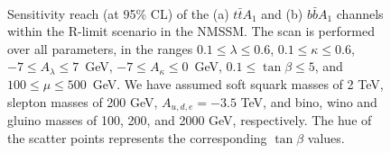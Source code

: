 \documentclass[preprintnumbers,superscriptaddress,nofootinbib,aps,prd,floatfix]{revtex4}
\begin{document}
\begin{enumerate}
\begin{figure}[htbp]
\begin{center}
 \\
\caption{Sensitivity reach (at 95\% CL) of  the (a) $t\bar{t}A_1$ and (b) $b\bar{b} A_1$ channels within the R-limit scenario in the NMSSM. 
The scan is performed over all parameters, in the ranges $0.1 \leq \lambda \leq 0.6$, 
$0.1 \leq \kappa \leq 0.6$, $-7 \leq A_\lambda \leq 7$~GeV, $-7 \leq A_\kappa \leq 0$~GeV,
$0.1 \leq \tan \beta \leq 5$, and $100 \leq \mu \leq 500$~GeV.  
We have assumed soft squark masses of 2 TeV, slepton masses of 200 GeV, $A_{u,d,e} = -3.5$ TeV, and bino, wino and gluino masses of
100, 200, and 2000 GeV, respectively. The hue of the scatter points represents the corresponding $\tan\beta$ values.}
\label{fig:reach_RS} 
\end{center}
\end{figure}


\end{enumerate}
\end{document}
